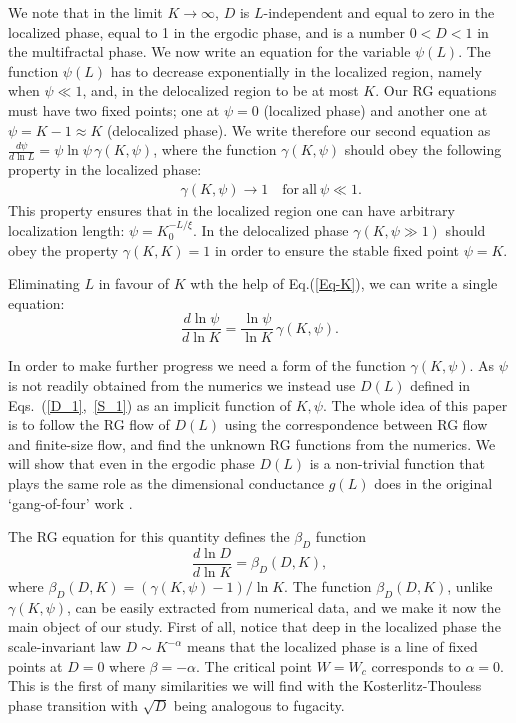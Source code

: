 \documentclass[reprint,aps,prl,superscriptaddress,english,nolongbibliography]{revtex4-1}
\begin{document}
We note that in the limit $K\rightarrow\infty$,  $D$ is   $L$-independent and equal to zero in the localized phase, equal to 1 in the ergodic phase, and is a number $0<D<1$ in the multifractal phase. We now write an equation for the variable $\psi(L)$. The function $\psi(L)$ has to decrease exponentially in the localized region, namely when $\psi\ll 1$, and, in the delocalized region to be at most $K$. Our RG equations must have two fixed points; one at $\psi=0$ (localized phase) and another one at $\psi=K-1\approx K$ (delocalized phase). We write therefore our second equation as $\frac{d\psi}{d\ln L}=\psi\ln \psi \, \gamma(K,\psi)$,  where the function $\gamma(K,\psi)$ should obey the following property in the localized phase:
\begin{eqnarray}
   && \gamma(K,\psi)\to 1\quad   \mathrm{for\ all\ }\psi\ll 1.
\end{eqnarray}
This property ensures that in the localized region one can have arbitrary localization length: $\psi=K_0^{-L/\xi}$. In the delocalized phase $\gamma(K,\psi\gg1 )$ should obey the property $\gamma(K,K)=1$  in order to ensure the stable fixed point $\psi=K$.

Eliminating $L$  in favour of $K$ wth the help of Eq.(\ref{Eq-K}), we can write a single equation: 
\begin{equation}
    \frac{d\ln\psi}{d\ln K}=\frac{\ln \psi}{\ln K} \, \gamma(K,\psi).
    \label{eq:psikRG}
\end{equation}
  
In order to make further progress we need a form of the function $\gamma(K,\psi)$. As $\psi$ is not readily obtained from the numerics we instead use $D(L)$ defined in Eqs.~(\ref{D_1},~\ref{S_1}) as an implicit function of $K,\psi$. The whole idea of this paper is to follow the RG flow of $D(L)$ using the correspondence between RG flow and finite-size flow, and find the unknown RG functions from the numerics. We will show that even in the ergodic phase $D(L)$ is a non-trivial function that plays the same role as the dimensional conductance $g(L)$ does in the original `gang-of-four' work \cite{abrahams1979scaling}. 

The RG equation for this quantity defines the $\beta_{D}$ function
\begin{equation}
    \frac{d\ln D}{d\ln K}=\beta_D(D,K),
\label{eq:def_beta}    
\end{equation}
where $\beta_{D}(D,K)=(\gamma(K,\psi)-1)/\ln K$.
The function $\beta_D(D,K)$, unlike $\gamma(K,\psi)$, can be easily extracted from numerical data, and we make it now the main object of our study. First of all, notice that deep in the localized phase the scale-invariant law $D\sim K^{-\alpha}$ means that the localized phase is a line of fixed points at $D=0$ where $\beta=-\alpha$. The critical point $W=W_c$ corresponds to $\alpha=0$. This is the first of many similarities we will find with the Kosterlitz-Thouless phase transition with $\sqrt{D}$ being analogous to fugacity.
\end{document}
